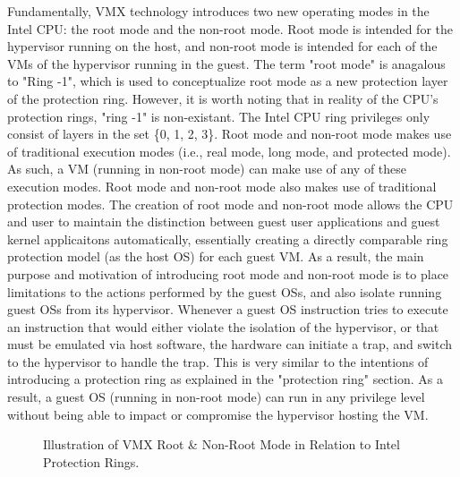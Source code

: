 \documentclass{report}
\begin{document}
\begin{spacing}{1.5}
{\large
Fundamentally, VMX technology introduces two new operating modes in the Intel CPU: the root mode and the non-root mode. Root mode is intended for the hypervisor running on the host, and non-root mode is intended for each of the VMs of the hypervisor running in the guest. The term "root mode" is anagalous to "Ring -1", which is used to conceptualize root mode as a new protection layer of the protection ring. However, it is worth noting that in reality of the CPU's protection rings, "ring -1" is non-existant. The Intel CPU ring privileges only consist of layers in the set \{0, 1, 2, 3\}. Root mode and non-root mode makes use of traditional execution modes (i.e., real mode, long mode, and protected mode). As such, a VM (running in non-root mode) can make use of any of these execution modes. Root mode and non-root mode also makes use of traditional protection modes. The creation of root mode and non-root mode allows the CPU and user to maintain the distinction between guest user applications and guest kernel applicaitons automatically, essentially creating a directly comparable ring protection model (as the host OS) for each guest VM. As a result, the main purpose and motivation of introducing root mode and non-root mode is to place limitations to the actions performed by the guest OSs, and also isolate running guest OSs from its hypervisor. Whenever a guest OS instruction tries to execute an instruction that would either violate the isolation of the hypervisor, or that must be emulated via host software, the hardware can initiate a trap, and switch to the hypervisor to handle the trap. This is very similar to the intentions of introducing a protection ring as explained in the "protection ring" section. As a result, a guest OS (running in non-root mode) can run in any privilege level without being able to impact or compromise the hypervisor hosting the VM.
\newline
}



\newpage
\vfill
\begin{figure}[ht]
\hspace*{-3cm}  
    \caption{Illustration of VMX Root \& Non-Root Mode in Relation to Intel Protection Rings.}
\end{figure}



\end{spacing}
\end{document}
